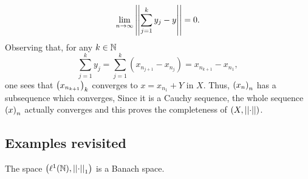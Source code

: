 \documentclass{article}
\begin{document}
\begin{fancyproof}
\begin{enumerate}
		\begin{equation*}
			\lim_{n\to\infty}\left|\left|\sum_{j=1}^{k}y_{j}-y\right|\right|=0.
		\end{equation*}
		Observing that, for any $k\in\mathbb{N}$
		\begin{equation*}
			\sum_{j=1}^{k}y_{j}=\sum_{j=1}^{k}\left(x_{n_{j+1}}-x_{n_{j}}\right)=x_{n_{k+1}}-x_{n_{1}},
		\end{equation*}
		one sees that ${\left(x_{n_{k+1}}\right)}_{k}$ converges to $x=x_{n_{1}}+Y$ in $X$. Thus, ${\left({x}_{n}\right)}_{n}$ has a subsequence which converges, Since it is a Cauchy sequence, the whole sequence ${\left(x\right)}_{n}$ actually converges and this proves the completeness of $\left(X,\left|\left|\cdot\right|\right|\right)$.
	\end{enumerate}
\end{fancyproof}\subsection{Examples revisited}
\begin{proposition}
	The space $\left(\ell^{1}(\mathbb{N}),\left|\left|\cdot\right|\right|_{1}\right)$ is a Banach space.
\end{proposition}
\end{document}
